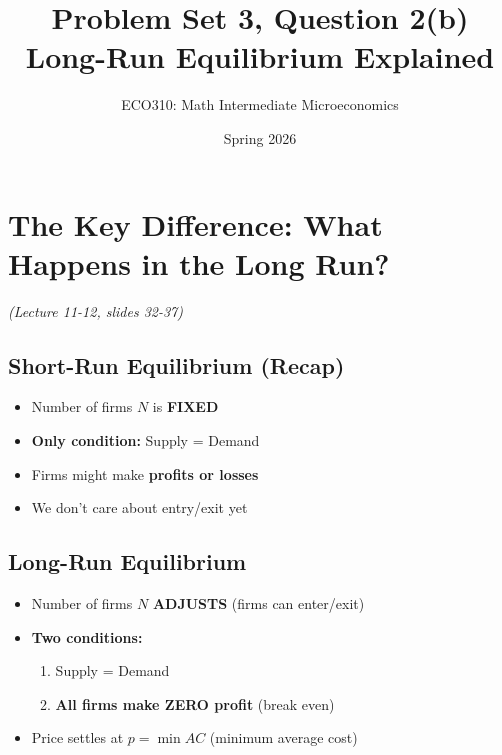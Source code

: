 \documentclass[11pt]{article}
\title{\textbf{Problem Set 3, Question 2(b)} \\ Long-Run Equilibrium Explained}
\author{ECO310: Math Intermediate Microeconomics}
\date{Spring 2026}
\begin{document}
\maketitle

\section{The Key Difference: What Happens in the Long Run?}
\textit{(Lecture 11-12, slides 32-37)}

\subsection*{Short-Run Equilibrium (Recap)}

\begin{tcolorbox}[colback=boxblue, colframe=blue!50!black, title=Short Run:]
\begin{itemize}[leftmargin=*]
    \item Number of firms $N$ is \textbf{FIXED}
    \item \textbf{Only condition:} Supply = Demand
    \item Firms might make \textbf{profits or losses}
    \item We don't care about entry/exit yet
\end{itemize}
\end{tcolorbox}

\subsection*{Long-Run Equilibrium}

\begin{tcolorbox}[colback=boxpink, colframe=red!50!black, title=Long Run:]
\begin{itemize}[leftmargin=*]
    \item Number of firms $N$ \textbf{ADJUSTS} (firms can enter/exit)
    \item \textbf{Two conditions:}
    \begin{enumerate}
        \item Supply = Demand
        \item \textbf{All firms make ZERO profit} (break even)
    \end{enumerate}
    \item Price settles at $p = \min AC$ (minimum average cost)
\end{itemize}
\end{tcolorbox}
\end{document}
